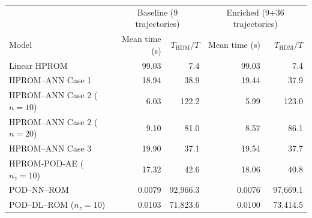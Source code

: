 \begin{tabular}{lrr|rr}
\toprule
& \multicolumn{2}{c|}{Baseline (9 trajectories)} & \multicolumn{2}{c}{Enriched (9+36 trajectories)} \\
Model & Mean time (s) & $T_{\mathrm{HDM}}/T$ & Mean time (s) & $T_{\mathrm{HDM}}/T$ \\
\midrule
Linear HPROM & 99.03 & 7.4 & 99.03 & 7.4 \\
HPROM--ANN Case 1 & 18.94 & 38.9 & 19.44 & 37.9 \\
HPROM--ANN Case 2 ($n=10$) & 6.03 & 122.2 & 5.99 & 123.0 \\
HPROM--ANN Case 2 ($n=20$) & 9.10 & 81.0 & 8.57 & 86.1 \\
HPROM--ANN Case 3 & 19.90 & 37.1 & 19.54 & 37.7 \\
HPROM-POD-AE ($n_z=10$) & 17.32 & 42.6 & 18.06 & 40.8 \\
\midrule
POD--NN--ROM & 0.0079 & 92,966.3 & 0.0076 & 97,669.1 \\
POD--DL--ROM ($n_z=10$) & 0.0103 & 71,823.6 & 0.0100 & 73,414.5 \\
\bottomrule
\end{tabular}

